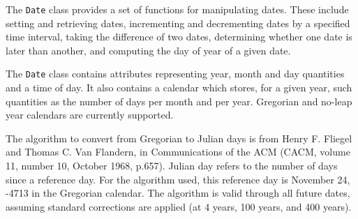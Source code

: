
The {\tt Date} class provides a set of functions for manipulating dates.
These include setting and retrieving dates, incrementing and decrementing 
dates by a specified time interval, taking the difference of two dates,
determining whether one date is later than another, and computing the
day of year of a given date.
   
The {\tt Date} class contains attributes representing year, month and day 
quantities and a time of day.  It also contains a calendar which 
stores, for a given year, such quantities as the number of days per 
month and per year.  Gregorian and no-leap year calendars are currently 
supported.  

The algorithm to convert from Gregorian to Julian days is from 
Henry F. Fliegel and Thomas C. Van Flandern, in Communications of 
the ACM (CACM, volume 11, number 10, October 1968, p.657).  Julian 
day refers to the number of days since a reference day.  For the 
algorithm used, this reference day is November 24, -4713 in the Gregorian 
calendar.  The algorithm is valid through all future dates, assuming 
standard corrections are applied (at 4 years, 100 years,
and 400 years).


